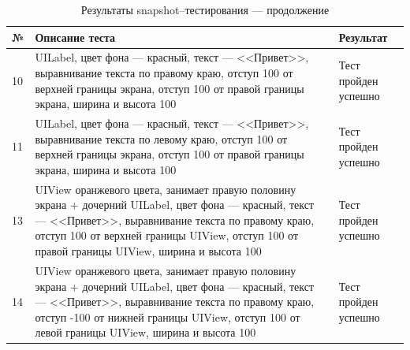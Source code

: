 \begin{table}[!htb]
 \label{table:tests2}
 \begin{center}
  \caption{Результаты snapshot--тестирования --- продолжение}
 \begin{tabular}{|p{0.6cm}|p{10cm}|p{5cm}|}
  \hline
   \bfseries № & \bfseries Описание теста & \bfseries Результат \\ \hline
   10 & UILabel, цвет фона --- красный, текст --- <<Привет>>, выравнивание текста по правому краю, отступ 100 от верхней границы экрана, отступ 100 от правой границы экрана, ширина и высота 100 & Тест пройден успешно  \\ \hline
   11 & UILabel, цвет фона --- красный, текст --- <<Привет>>, выравнивание текста по левому краю, отступ 100 от верхней границы экрана, отступ 100 от правой границы экрана, ширина и высота 100 & Тест пройден успешно  \\ \hline
   13 & UIView оранжевого цвета, занимает правую половину экрана + дочерний UILabel, цвет фона --- красный, текст --- <<Привет>>, выравнивание текста по правому краю, отступ 100 от верхней границы UIView, отступ 100 от правой границы UIView, ширина и высота 100 & Тест пройден успешно  \\ \hline
   14 & UIView оранжевого цвета, занимает правую половину экрана + дочерний UILabel, цвет фона --- красный, текст --- <<Привет>>, выравнивание текста по правому краю, отступ -100 от нижней границы UIView, отступ 100 от левой границы UIView, ширина и высота 100 & Тест пройден успешно  \\ \hline
  \end{tabular}
 \end{center}
\end{table}

